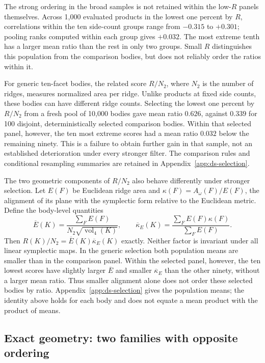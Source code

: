 The strong ordering in the broad samples is not retained within the
low-$R$ panels themselves. Across 1,000 evaluated products in the lowest
one percent by $R$, correlations within the ten side-count groups range
from $-0.315$ to $+0.301$; pooling ranks computed within each group gives
$+0.032$. The most extreme tenth has a larger mean ratio than the rest
in only two groups. Small $R$ distinguishes this population from the
comparison bodies, but does not reliably order the ratios within it.

For generic ten-facet bodies, the related score $R/N_2$, where $N_2$ is
the number of ridges, measures normalized area per ridge. Unlike products
at fixed side counts, these bodies can have different ridge counts.
Selecting the lowest one percent by $R/N_2$ from a fresh pool of 10,000
bodies gave mean ratio $0.626$, against $0.339$ for 100 disjoint,
deterministically selected comparison bodies. Within that selected panel, however,
the ten most extreme scores had a mean ratio $0.032$ below the remaining
ninety. This is a failure to obtain further gain in that sample, not an
established deterioration under every stronger filter. The comparison
rules and conditional resampling summaries are retained in
Appendix~\ref{app:ds-selection}.

The two geometric components of $R/N_2$ also behave differently under
stronger selection. Let $E(F)$ be Euclidean ridge area and
$\kappa(F)=A_\omega(F)/E(F)$, the alignment of its plane with the
symplectic form relative to the Euclidean metric. Define the body-level
quantities
\[
 \overline E(K)=\frac{\sum_F E(F)}{N_2\sqrt{\operatorname{vol}_4(K)}},
 \qquad
 \overline\kappa_E(K)=\frac{\sum_F E(F)\kappa(F)}{\sum_F E(F)}.
\]
Then $R(K)/N_2=\overline E(K)\overline\kappa_E(K)$ exactly. Neither
factor is invariant under all linear symplectic maps. In the generic
selection both population means are smaller than in the comparison panel.
Within the selected panel, however, the ten lowest scores have slightly
larger $\overline E$ and smaller $\overline\kappa_E$ than the other
ninety, without a larger mean ratio. Thus smaller alignment alone does
not order these selected bodies by ratio. Appendix~\ref{app:ds-selection}
gives the population means; the identity above holds for each body and
does not equate a mean product with the product of means.

\subsection{Exact geometry: two families with opposite ordering}

